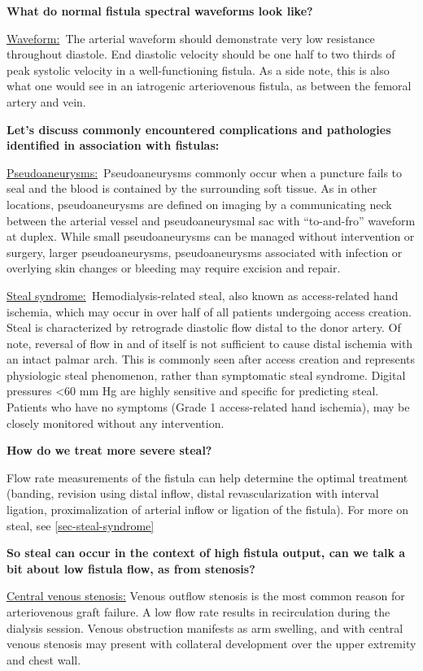 \documentclass[
]{book}
\begin{document}
\textbf{What do normal fistula spectral waveforms look like?}

\uline{Waveform:}~The arterial waveform should demonstrate very
low resistance throughout diastole. End diastolic velocity should be one
half to two thirds of peak systolic velocity in a well-functioning
fistula. As a side note, this is also what one would see in an
iatrogenic arteriovenous fistula, as between the femoral artery and
vein.\citep{teodorescu2012}

\textbf{Let's discuss commonly encountered complications and pathologies
identified in association with fistulas:}

\uline{Pseudoaneurysms:}~Pseudoaneurysms commonly occur when a
puncture fails to seal and the blood is contained by the surrounding
soft tissue. As in other locations, pseudoaneurysms are defined on
imaging by a communicating neck between the arterial vessel and
pseudoaneurysmal sac with ``to-and-fro'' waveform at duplex.\citep{mahmoud2015}
While small pseudoaneurysms can be managed without intervention or
surgery, larger pseudoaneurysms, pseudoaneurysms associated with
infection or overlying skin changes or bleeding may require excision and
repair.\citep{bandyk2013}

\uline{Steal syndrome:}~Hemodialysis-related steal, also known as
access-related hand ischemia, which may occur in over half of all
patients undergoing access creation. Steal is characterized by
retrograde diastolic flow distal to the donor artery. Of note, reversal
of flow in and of itself is not sufficient to cause distal ischemia with
an intact palmar arch. This is commonly seen after access creation and
represents physiologic steal phenomenon, rather than symptomatic steal
syndrome. Digital pressures \textless60 mm Hg are highly sensitive and specific
for predicting steal. Patients who have no symptoms (Grade 1
access-related hand ischemia), may be closely monitored without any
intervention.

\textbf{How do we treat more severe steal?}

Flow rate measurements of the fistula can help determine the optimal
treatment (banding, revision using distal inflow, distal
revascularization with interval ligation, proximalization of arterial
inflow or ligation of the fistula). For more on steal, see
\ref{sec-steal-syndrome}

\textbf{So steal can occur in the context of high fistula output, can we talk
a bit about low fistula flow, as from stenosis?}

\uline{Central venous stenosis:} Venous outflow stenosis is the
most common reason for arteriovenous graft failure. A low flow rate
results in recirculation during the dialysis session. Venous obstruction
manifests as arm swelling, and with central venous stenosis may present
with collateral development over the upper extremity and chest wall.
\end{document}
